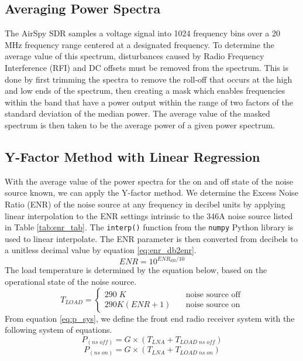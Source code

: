 \documentclass[twocolumn]{aastex631}
\begin{document}
\subsection{Averaging Power Spectra}
The AirSpy SDR samples a voltage signal into 1024 frequency bins over a 20 MHz frequency range centered at a designated frequency. To determine the average value of this spectrum, disturbances caused by Radio Frequency Interference (RFI) and DC offsets must be removed from the spectrum. This is done by first trimming the spectra to remove the roll-off that occurs at the high and low ends of the spectrum, then creating a mask which enables frequencies within the band that have a power output within the range of two factors of the standard deviation of the median power. The average value of the masked spectrum is then taken to be the average power of a given power spectrum.

\subsection{Y-Factor Method with Linear Regression}
With the average value of the power spectra for the on and off state of the noise source known, we can apply the Y-factor method.
We determine the Excess Noise Ratio (ENR) of the noise source at any frequency in decibel units by applying linear interpolation to the ENR settings intrinsic to the 346A noise source listed in Table \ref{tab:enr_tab}. The \texttt{interp()} function from the \texttt{numpy} Python library is used to linear interpolate. The ENR parameter is then converted from decibels to a unitless decimal value by equation \ref{eq:enr_db2enr}.
\begin{equation}\label{eq:enr_db2enr}
    ENR = 10^{ENR_{dB}/10}
\end{equation}
The load temperature is determined by the equation below, based on the operational state of the noise source. 
\begin{equation*}\label{eq:T_load}
T_{LOAD} = \left\{
        \begin{array}{ll}
            290\; K & \quad \mbox{noise source off} \\
            290K(ENR+1) & \quad \mbox{noise source on} 
        \end{array}
    \right.
\end{equation*}
From equation \ref{eq:p_sys}, we define the front end radio receiver system with the following system of equations.
\begin{equation}
    P_{(ns\;off)} = G \times (T_{LNA} + T_{LOAD\;ns\;off})
\end{equation}
\begin{equation}
     P_{(ns\;on)} = G\times (T_{LNA} + T_{LOAD\;ns\;on})
\end{equation}
\end{document}
